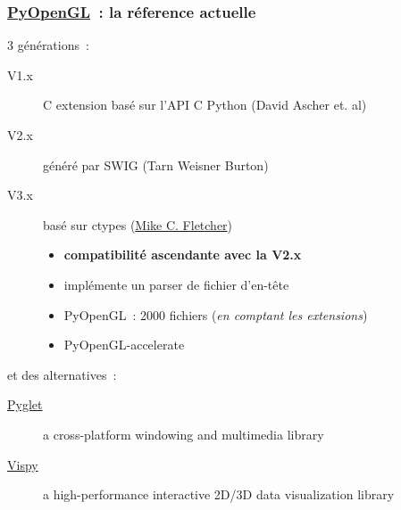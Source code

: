 \begin{frame}[fragile]
  \frametitle{\href{http://pyopengl.sourceforge.net}{PyOpenGL}~: la réference actuelle}
  3 générations~:
  \begin{description}
    \item[V1.x] C extension basé sur l'API C Python {\tiny (David Ascher et. al)}
    \item[V2.x] généré par SWIG {\tiny (Tarn Weisner Burton)}
    \item[V3.x] basé sur ctypes {\tiny (\href{http://www.vrplumber.com}{Mike C. Fletcher})}
      \begin{itemize}
      \item \textbf{compatibilité ascendante avec la V2.x}
      \item implémente un parser de fichier d'en-tête
      \item PyOpenGL~: 2000 fichiers \small({\emph{en comptant les extensions})}
      \item PyOpenGL-accelerate
      \end{itemize}
    \end{description}
    \vspace{1em}
    et des alternatives~:
    \begin{description}
    \item[\href{http://www.pyglet.org}{Pyglet}] a cross-platform windowing and multimedia library
    \item[\href{http://vispy.org}{Vispy}] a high-performance interactive 2D/3D data visualization library
    \end{description}
\end{frame}

